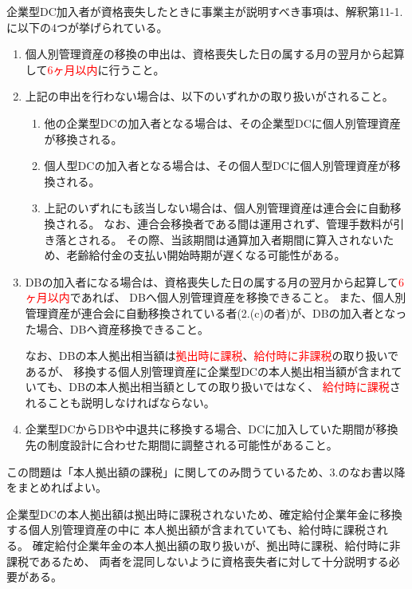 \begin{itembox}[l]{}
  企業型DC加入者が資格喪失したときに事業主が説明すべき事項は、解釈第11-1.に以下の4つが挙げられている。

  \begin{enumerate}
    \item 個人別管理資産の移換の申出は、資格喪失した日の属する月の翌月から起算して\textcolor{red}{6ヶ月以内}に行うこと。
    \item 上記の申出を行わない場合は、以下のいずれかの取り扱いがされること。
    \begin{enumerate}
      \item 他の企業型DCの加入者となる場合は、その企業型DCに個人別管理資産が移換される。
      \item 個人型DCの加入者となる場合は、その個人型DCに個人別管理資産が移換される。
      \item 上記のいずれにも該当しない場合は、個人別管理資産は連合会に自動移換される。
      なお、連合会移換者である間は運用されず、管理手数料が引き落とされる。
      その際、当該期間は通算加入者期間に算入されないため、老齢給付金の支払い開始時期が遅くなる可能性がある。
    \end{enumerate}
    \item DBの加入者になる場合は、資格喪失した日の属する月の翌月から起算して\textcolor{red}{6ヶ月以内}であれば、
      DBへ個人別管理資産を移換できること。
      また、個人別管理資産が連合会に自動移換されている者(2.(c)の者)が、DBの加入者となった場合、DBへ資産移換できること。

      なお、DBの本人拠出相当額は\textcolor{red}{拠出時に課税}、\textcolor{red}{給付時に非課税}の取り扱いであるが、
      移換する個人別管理資産に企業型DCの本人拠出相当額が含まれていても、DBの本人拠出相当額としての取り扱いではなく、
      \textcolor{red}{給付時に課税}されることも説明しなければならない。
    
    \item 企業型DCからDBや中退共に移換する場合、DCに加入していた期間が移換先の制度設計に合わせた期間に調整される可能性があること。
  \end{enumerate}

  この問題は「本人拠出額の課税」に関してのみ問うているため、3.のなお書以降をまとめればよい。

\end{itembox}

\begin{sol}
  \;
  
  企業型DCの本人拠出額は拠出時に課税されないため、確定給付企業年金に移換する個人別管理資産の中に
  本人拠出額が含まれていても、給付時に課税される。
  確定給付企業年金の本人拠出額の取り扱いが、拠出時に課税、給付時に非課税であるため、
  両者を混同しないように資格喪失者に対して十分説明する必要がある。
\end{sol}

